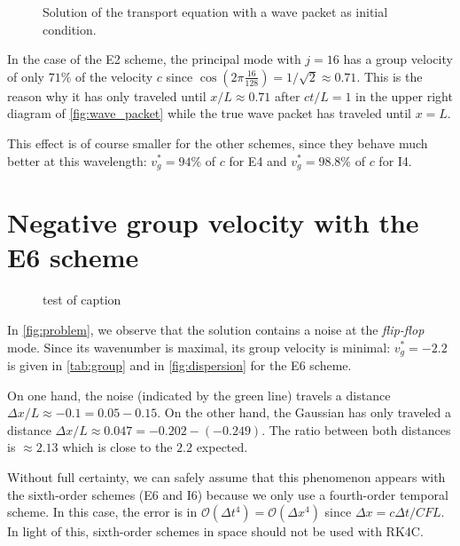 \documentclass[11 pt]{article}
\begin{document}
\begin{figure}[H]
    \centering
    
    \caption{Solution of the transport equation with a wave packet as initial condition.}
    \label{fig:wave_packet}
\end{figure}

In the case of the E2 scheme, the principal mode with $j=16$ has a group velocity of only $71\%$ of the velocity $c$ since $\cos{(2 \pi \frac{16}{128})} = 1/\sqrt{2} \approx 0.71$. This is the reason why it has only traveled until $x/L \approx 0.71$ after $ct/L=1$ in the upper right diagram of \autoref{fig:wave_packet} while the true wave packet has traveled until $x=L$.

This effect is of course smaller for the other schemes, since they behave much better at this wavelength: $v_g^* = 94 \%$ of $c$ for E4 and $v_g^* = 98.8 \% $ of $c$ for I4.


\section{Negative group velocity with the E6 scheme}
\begin{figure}[H]
    \centering
    
    \caption{test of caption}
    \label{fig:problem}
\end{figure}

\vspace{-3mm}
In \autoref{fig:problem}, we observe that the solution contains a noise at the \textit{flip-flop} mode. Since its wavenumber is maximal, its group velocity is minimal: $v_g^* = -2.2$ is given in \autoref{tab:group} and in \autoref{fig:dispersion} for the E6 scheme.

On one hand, the noise (indicated by the green line) travels a distance $\Delta x / L \approx -0.1 = 0.05 - 0.15$. On the other hand, the Gaussian has only traveled a distance $\Delta x / L \approx 0.047 = -0.202 - (-0.249)$. The ratio between both distances is $\approx 2.13$ which is close to the $2.2$ expected.

Without full certainty, we can safely assume that this phenomenon appears with the sixth-order schemes (E6 and I6) because we only use a fourth-order temporal scheme. In this case, the error is in $\mathcal{O}(\Delta t^4) = \mathcal{O}(\Delta x^4)$ since $\Delta x = c \Delta t / CFL$. In light of this, sixth-order schemes in space should not be used with RK4C.
\end{document}
